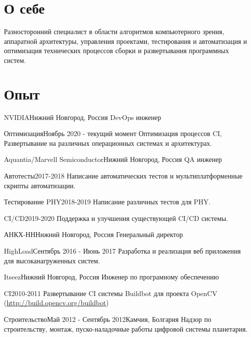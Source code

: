 \documentclass[12pt,a4paper]{moderncv}
\begin{document}
\maketitle

\section{О себе}
Разносторонний специалист в области алгоритмов компьютерного зрения, аппаратной архитектуры, управления проектами, тестирования и автоматизация и оптимизация технических процессов сборки и развертывания программных систем.

\section{Опыт}
	{NVIDIA}{Нижний Новгород, Россия}{}{}
	{DevOps инженер}

\cventry{}
	{Оптимизация}{Ноябрь 2020 - текущий момент}{}{}
	{Оптимизация процессов CI, Развертывание на различных операционных системах и архитектурах.}

	{Aquantia/Marvell Semiconductor}{Нижний Новгород, Россия}{}{}
	{QA инженер}

\cventry{}
	{Автотесты}{2017-2018}{}{}
	{Написание автоматических тестов и мультиплатформенные скрипты автоматизации.}

\cventry{}
	{Тестирование PHY}{2018-2019}{}{}
	{Написание различных тестов для PHY.}

\cventry{}
	{CI/CD}{2019-2020}{}{}
	{Поддержка и улучшения существующей CI/CD системы.}

	{АНКХ-НН}{Нижний Новгород, Россия}{}{}
	{Генеральный директор}

\cventry{}
	{HighLoad}{Сентябрь 2016 - Июнь 2017}{}{}
	{Разработка и реализация веб приложения для высоканагруженных систем.}

	{Itseez}{Нижний Новгород, Россия}{}{}
	{Инженер по програмному обеспечению}

\cventry{}
	{CI}{2010-2011}{}{}
	{Развертывание CI системы Buildbot для проекта OpenCV \newline (\url{http://build.opencv.org/buildbot})}

\cventry{}
	{Строительство}{Май 2012 - Сентябрь 2012}{Камчия, Болгария}{}
	{Надзор по строительству, монтаж, пуско-наладочные работы цифровой системы планетария.}
\end{document}
